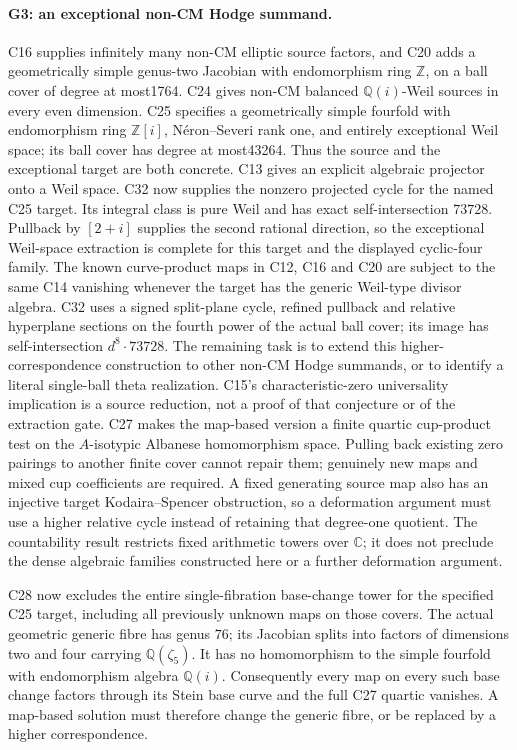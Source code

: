 \documentclass[11pt]{article}
\newcommand{\Q}{\mathbb Q}\newcommand{\C}{\mathbb C}\newcommand{\Z}{\mathbb Z}\newcommand{\R}{\mathbb R}\newcommand{\A}{\mathbb A}\newcommand{\OO}{\mathcal O}
\theoremstyle{definition}\newtheorem{definition}[theorem]{Definition}\newtheorem{remark}[theorem]{Remark}
\begin{document}
\paragraph{G3: an exceptional non-CM Hodge summand.}
C16 supplies infinitely many non-CM elliptic source factors, and
C20 adds a geometrically simple genus-two Jacobian with
endomorphism ring $\Z$, on a ball cover of degree at most1764.
C24 gives non-CM balanced $\Q(i)$-Weil sources in every
even dimension. C25 specifies a geometrically simple fourfold
with endomorphism ring $\Z[i]$, N\'eron--Severi rank one,
and entirely exceptional Weil space; its ball cover has degree
at most43264. Thus the source and the exceptional target
are both concrete.
C13 gives an explicit algebraic projector onto a Weil space.
C32 now supplies the nonzero projected cycle for the named
C25 target. Its integral class is pure Weil and has exact
self-intersection $73728$. Pullback by $[2+i]$ supplies the
second rational direction, so the exceptional Weil-space
extraction is complete for this target and the displayed
cyclic-four family.
The known curve-product maps in C12, C16 and C20 are subject to the
same C14 vanishing whenever the target has the generic Weil-type
divisor algebra. C32 uses a signed split-plane cycle, refined
pullback and relative hyperplane sections on the fourth power
of the actual ball cover; its image has self-intersection
$d^8\cdot73728$. The remaining task is to extend this
higher-correspondence construction to other non-CM Hodge
summands, or to identify a literal single-ball theta realization.
C15's characteristic-zero universality implication is a source
reduction, not a proof of that conjecture or of the extraction gate.
C27 makes the map-based version a finite quartic cup-product
test on the $A$-isotypic Albanese homomorphism space. Pulling
back existing zero pairings to another finite cover cannot
repair them; genuinely new maps and mixed cup coefficients
are required. A fixed generating source map also has an
injective target Kodaira--Spencer obstruction, so a deformation
argument must use a higher relative cycle instead of retaining
that degree-one quotient.
The countability result restricts fixed arithmetic towers over
$\C$; it does not preclude the dense algebraic families constructed
here or a further deformation argument.

C28 now excludes the entire single-fibration base-change
tower for the specified C25 target, including all previously
unknown maps on those covers. The actual geometric generic
fibre has genus $76$; its Jacobian splits into factors of
dimensions two and four carrying $\Q(\zeta_5)$. It has no
homomorphism to the simple fourfold with endomorphism algebra
$\Q(i)$. Consequently every map on every such base change
factors through its Stein base curve and the full C27 quartic
vanishes. A map-based solution must therefore change the
generic fibre, or be replaced by a higher correspondence.
\end{document}
